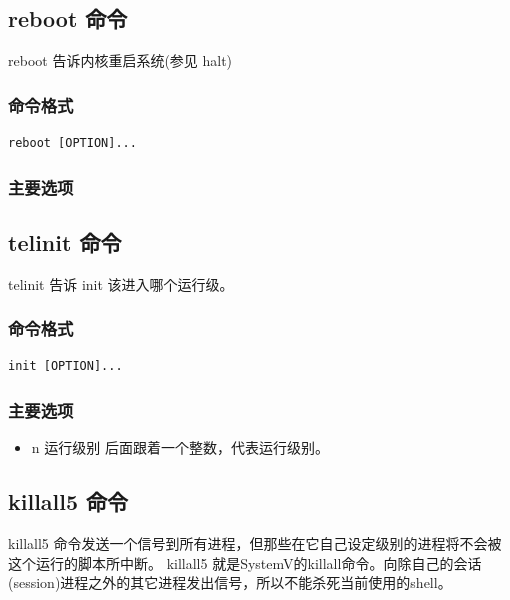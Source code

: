 \subsection{reboot 命令}

reboot 告诉内核重启系统(参见 halt)

\subsubsection{命令格式}

{\begin{shaded}\begin{verbatim}
reboot [OPTION]...
\end{verbatim}\end{shaded}}
\subsubsection{主要选项}

\subsection{telinit 命令}

telinit 告诉 init 该进入哪个运行级。

\subsubsection{命令格式}

{\begin{shaded}\begin{verbatim}
init [OPTION]...
\end{verbatim}\end{shaded}}
\subsubsection{主要选项}

\begin{itemize}
\item
  n 运行级别 后面跟着一个整数，代表运行级别。
\end{itemize}
\subsection{killall5 命令}

killall5
命令发送一个信号到所有进程，但那些在它自己设定级别的进程将不会被这个运行的脚本所中断。
killall5
就是SystemV的killall命令。向除自己的会话(session)进程之外的其它进程发出信号，所以不能杀死当前使用的shell。

